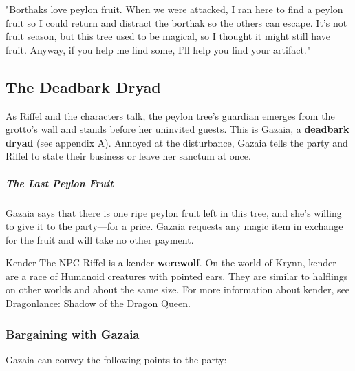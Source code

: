 \documentclass[10pt,a4paper,twoside,bg=print,twocolumn,openany,nodeprecatedcode]{dndbook}
\begin{document}
\begin{DndReadAloud}{}
"Borthaks love peylon fruit. When we were attacked, I ran here to find a peylon fruit so I could return and distract the borthak so the others can escape. It's not fruit season, but this tree used to be magical, so I thought it might still have fruit. Anyway, if you help me find some, I'll help you find your artifact."

\end{DndReadAloud}

\subsection{The Deadbark Dryad}
As Riffel and the characters talk, the peylon tree's guardian emerges from the grotto's wall and stands before her uninvited guests. This is Gazaia, a \textbf{deadbark dryad} (see appendix A). Annoyed at the disturbance, Gazaia tells the party and Riffel to state their business or leave her sanctum at once.

\subparagraph{The Last Peylon Fruit}
Gazaia says that there is one ripe peylon fruit left in this tree, and she's willing to give it to the party—for a price. Gazaia requests any magic item in exchange for the fruit and will take no other payment.

\begin{DndSidebar}[float=!b]{Kender}
The NPC Riffel is a kender \textbf{werewolf}. On the world of Krynn, kender are a race of Humanoid creatures with pointed ears. They are similar to halflings on other worlds and about the same size. For more information about kender, see Dragonlance: Shadow of the Dragon Queen.



\end{DndSidebar}

\subsubsection{Bargaining with Gazaia}
Gazaia can convey the following points to the party:
\end{document}
